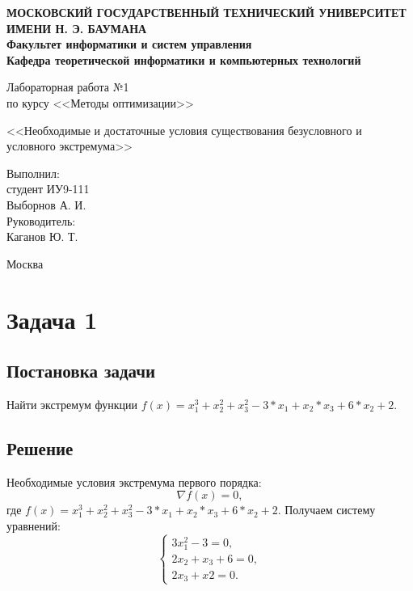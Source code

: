 \documentclass[12pt,a4paper,oneside]{extarticle}
\begin{document}
\pgfplotsset{compat=1.8}

\thispagestyle{empty}
\newpage
{
\centering


\textbf{
МОСКОВСКИЙ ГОСУДАРСТВЕННЫЙ ТЕХНИЧЕСКИЙ УНИВЕРСИТЕТ ИМЕНИ Н. Э. БАУМАНА \\
Факультет информатики и систем управления \\
Кафедра теоретической информатики и компьютерных технологий}
\bigskip
\bigskip
\bigskip
\bigskip
\bigskip
\bigskip
\bigskip

\vfill


Лабораторная работа №1 \\
по курсу <<Методы оптимизации>>

\bigskip

{\large <<Необходимые и достаточные условия существования безусловного и условного экстремума>>}
\bigskip

\vfill



\hfill\parbox{4cm} {
Выполнил:\\
студент ИУ9-111 \hfill \\
Выборнов А. И.\hfill \medskip\\
Руководитель:\\
Каганов Ю. Т.\hfill
}


\vspace{\fill}

Москва \number\year
\clearpage
}



\clearpage

\section{Задача 1}
    \subsection{Постановка задачи}
        Найти экстремум функции $f(x) = x_1^3 + x_2^2 + x_3^2 - 3*x_1 + x_2*x_3 + 6*x_2 + 2$. 

    \subsection{Решение}
        Необходимые условия экстремума первого порядка:
        $$\nabla f(x) = 0,$$ где $f(x) = x_1^3 + x_2^2 + x_3^2 - 3*x_1 + x_2*x_3 + 6*x_2 + 2$. Получаем систему уравнений:
        \begin{equation}
            \begin{cases}
               3x_1^2-3 = 0, \\
               2x_2 + x_3 + 6 = 0, \\
               2x_3 + x2 = 0.
            \end{cases}
        \end{equation}
\end{document}
